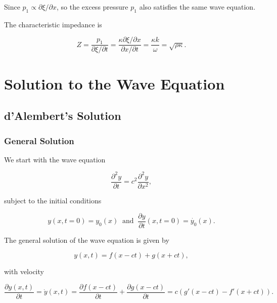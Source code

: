 \documentclass[a4paper,12pt]{report}
\begin{document}
Since \(p_1 \propto \partial \xi /\partial x\), so the excess pressure \(p_1 \) also satisfies the same wave equation.  

The characteristic impedance is 

\begin{equation}
	Z = \frac{p_1 }{\partial \xi  /\partial t } = \frac{\kappa \partial \xi /\partial x }{\partial x /\partial t} = \frac{\kappa k}{\omega } = \sqrt{\rho \kappa }.     
\end{equation}






\section{Solution to the Wave Equation}

\subsection{d'Alembert's Solution}

\subsubsection{General Solution}

We start with the wave equation 

\begin{equation}
	\frac{\partial^2 y}{\partial t} = c^2 \frac{\partial^2 y}{\partial x^2}, \label{waveequation} 
\end{equation}

subject to the initial conditions 

\begin{equation}
	y(x,t=0) = y_0 (x) ~\text { and }~ \frac{\partial y}{\partial t} (x,t=0) = \dot{y_0 }(x). 
\end{equation}

The general solution of the wave equation is given by

\begin{equation}
	y(x,t) = f(x-ct) + g(x+ct),
\end{equation}

with velocity

\begin{equation}
	\frac{\partial y(x,t)}{\partial t} = \dot{y}(x,t) = \frac{\partial f(x-ct)}{\partial t} + \frac{\partial g(x-ct)}{\partial t} = c(g'(x-ct) - f'(x+ct)).
\end{equation}
\end{document}
